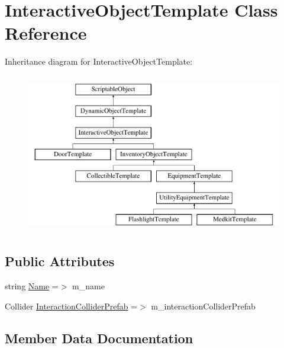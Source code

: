 \hypertarget{class_interactive_object_template}{}\section{Interactive\+Object\+Template Class Reference}
\label{class_interactive_object_template}
Inheritance diagram for Interactive\+Object\+Template\+:\begin{figure}[H]
\begin{center}
\leavevmode
\includegraphics[height=7.000000cm]{class_interactive_object_template}
\end{center}
\end{figure}
\subsection*{Public Attributes}
\begin{DoxyCompactItemize}
\item 
string \mbox{\hyperlink{class_interactive_object_template_a19d385a907f2c9be1a393b25c0ef61ba}{Name}} =$>$ m\+\_\+name
\item 
Collider \mbox{\hyperlink{class_interactive_object_template_aa9ebdac0791b0645c413e69d14ab74a6}{Interaction\+Collider\+Prefab}} =$>$ m\+\_\+interaction\+Collider\+Prefab
\end{DoxyCompactItemize}


\subsection{Member Data Documentation}
\mbox{\label{class_interactive_object_template_aa9ebdac0791b0645c413e69d14ab74a6}} 
